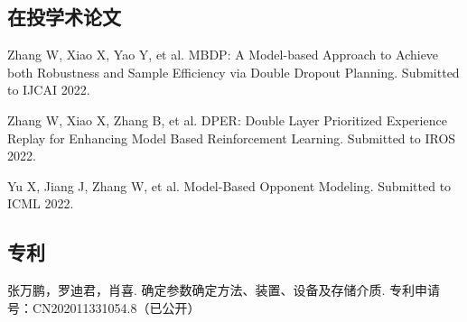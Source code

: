 \begin{resume}
  \subsection*{在投学术论文}
  \begin{achievements}
    \item Zhang W, Xiao X, Yao Y, et al. MBDP: A Model-based Approach to Achieve both Robustness and Sample Efficiency via Double Dropout Planning. Submitted to IJCAI 2022.
    \item Zhang W, Xiao X, Zhang B, et al. DPER: Double Layer Prioritized Experience Replay for Enhancing Model Based Reinforcement Learning. Submitted to IROS 2022.
    \item Yu X, Jiang J, Zhang W, et al. Model-Based Opponent Modeling. Submitted to ICML 2022.
  \end{achievements}


  \subsection*{专利}

  \begin{achievements}
    \item 张万鹏，罗迪君，肖喜. 确定参数确定方法、装置、设备及存储介质. 专利申请号：CN202011331054.8（已公开）
  \end{achievements}

\end{resume}

